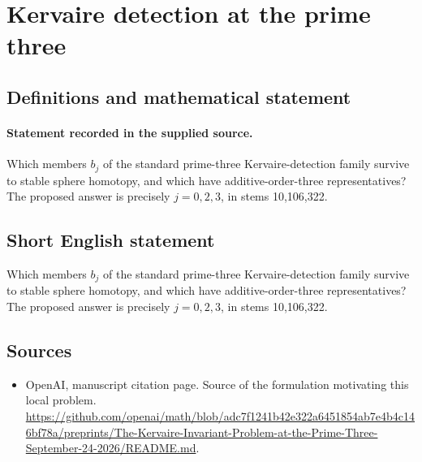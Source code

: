 \documentclass[11pt]{article}
\begin{document}
\section*{Kervaire detection at the prime three}\label{statement}
\subsection{Definitions and mathematical statement}
\paragraph{Statement recorded in the supplied source.}
Which members $b_j$ of the standard prime-three Kervaire-detection family survive to stable sphere homotopy, and which have additive-order-three representatives? The proposed answer is precisely $j=0,2,3$, in stems 10,106,322.
\subsection{Short English statement}
Which members $b_j$ of the standard prime-three Kervaire-detection family survive to stable sphere homotopy, and which have additive-order-three representatives? The proposed answer is precisely $j=0,2,3$, in stems 10,106,322.
\subsection{Sources}
\begin{itemize}
\item[S1] OpenAI, manuscript citation page. Source of the formulation motivating this local problem.
\url{https://github.com/openai/math/blob/adc7f1241b42e322a6451854ab7e4b4c146bf78a/preprints/The-Kervaire-Invariant-Problem-at-the-Prime-Three-September-24-2026/README.md}.
\end{itemize}
\end{document}
